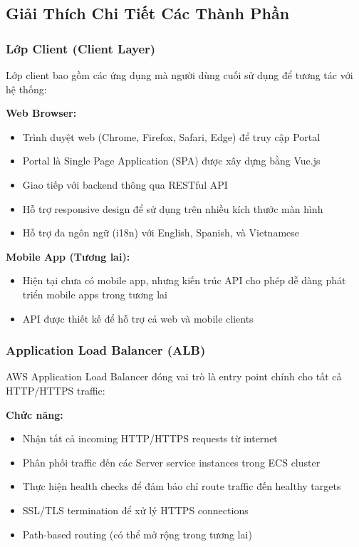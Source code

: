 
\subsection{Giải Thích Chi Tiết Các Thành Phần}

\subsubsection{Lớp Client (Client Layer)}

Lớp client bao gồm các ứng dụng mà người dùng cuối sử dụng để tương tác với hệ thống:

\textbf{Web Browser:}
\begin{itemize}
    \item Trình duyệt web (Chrome, Firefox, Safari, Edge) để truy cập Portal
    \item Portal là Single Page Application (SPA) được xây dựng bằng Vue.js
    \item Giao tiếp với backend thông qua RESTful API
    \item Hỗ trợ responsive design để sử dụng trên nhiều kích thước màn hình
    \item Hỗ trợ đa ngôn ngữ (i18n) với English, Spanish, và Vietnamese
\end{itemize}

\textbf{Mobile App (Tương lai):}
\begin{itemize}
    \item Hiện tại chưa có mobile app, nhưng kiến trúc API cho phép dễ dàng phát triển mobile apps trong tương lai
    \item API được thiết kế để hỗ trợ cả web và mobile clients
\end{itemize}

\subsubsection{Application Load Balancer (ALB)}

AWS Application Load Balancer đóng vai trò là entry point chính cho tất cả HTTP/HTTPS traffic:

\textbf{Chức năng:}
\begin{itemize}
    \item Nhận tất cả incoming HTTP/HTTPS requests từ internet
    \item Phân phối traffic đến các Server service instances trong ECS cluster
    \item Thực hiện health checks để đảm bảo chỉ route traffic đến healthy targets
    \item SSL/TLS termination để xử lý HTTPS connections
    \item Path-based routing (có thể mở rộng trong tương lai)
\end{itemize}

